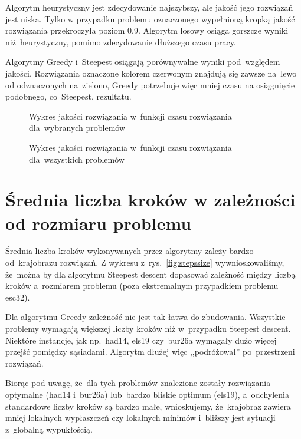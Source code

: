 \documentclass[a4paper,10pt]{article}
\begin{document}
Algorytm heurystyczny jest zdecydowanie najszybszy, ale jakość jego rozwiązań jest niska. 
Tylko w przypadku problemu oznaczonego wypełnioną kropką jakość rozwiązania przekroczyła poziom \num{0.9}.
Algorytm losowy osiąga gorszcze wyniki niż~heurystyczny, pomimo zdecydowanie dłuższego czasu pracy.

Algorytmy Greedy i~Steepest osiągają porównywalne wyniki pod~względem jakości.
Rozwiązania oznaczone kolorem czerwonym znajdują się zawsze na~lewo od odznaczonych na~zielono,
Greedy potrzebuje więc mniej czasu na osiągnięcie podobnego, co~Steepest, rezultatu.

\begin{figure}[h!]
\begin{center}

\caption{Wykres jakości rozwiązania w~funkcji czasu rozwiązania dla~wybranych problemów}
\label{fig:qualitytime}
\end{center}
\end{figure}

\begin{figure}
\begin{center}

\caption{Wykres jakości rozwiązania w~funkcji czasu rozwiązania dla~wszystkich problemów}
\label{fig:qualitytimefull}
\end{center}
\end{figure}

\section{Średnia liczba kroków w zależności od rozmiaru problemu}
Średnia liczba kroków wykonywanych przez algorytmy zależy bardzo od~krajobrazu rozwiązań.
Z wykresu z~rys.~\ref{fig:stepssize} wywnioskowaliśmy, że~można by dla algorytmu Steepest descent dopasować zależność między liczbą kroków
a~rozmiarem problemu (poza ekstremalnym przypadkiem problemu esc32).

Dla algorytmu Greedy zależność nie jest tak łatwa do zbudowania.
Wszystkie problemy wymagają większej liczby kroków niż w~przypadku Steepest descent. 
Niektóre instancje, jak np.~had14, els19 czy~bur26a wymagały dużo więcej przejść pomiędzy sąsiadami.
Algorytm dłużej więc ,,podróżował'' po~przestrzeni rozwiązań.

Biorąc pod uwagę, że~dla tych problemów znalezione zostały rozwiązania optymalne (had14 i~bur26a)
lub~bardzo bliskie optimum (els19), a~odchylenia standardowe liczby kroków są bardzo małe, wnioskujemy,
że~krajobraz zawiera mniej lokalnych wypłaszczeń czy lokalnych minimów i~bliższy jest sytuacji z~globalną wypukłością.
\end{document}
